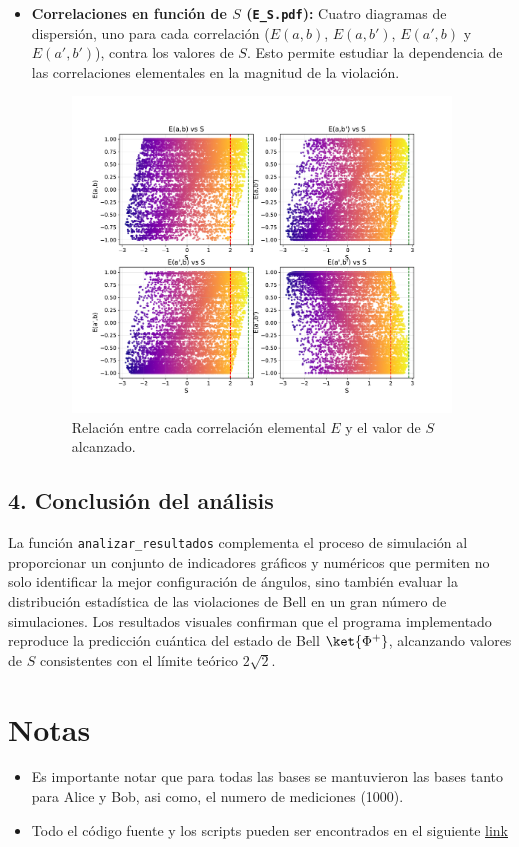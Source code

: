 \documentclass[11pt]{article}
\begin{document}
\begin{itemize}
    \item \textbf{Correlaciones en función de $S$ (\texttt{E\_S.pdf}):}  
    Cuatro diagramas de dispersión, uno para cada correlación ($E(a,b)$, $E(a,b')$, $E(a',b)$ y $E(a',b')$), contra los valores de $S$. Esto permite estudiar la dependencia de las correlaciones elementales en la magnitud de la violación.
    
    \begin{figure}[H]
        \centering
        \includegraphics[width=0.95\textwidth]{Figures/E_S.pdf}
        \caption{Relación entre cada correlación elemental $E$ y el valor de $S$ alcanzado.}
    \end{figure}
\end{itemize}


\subsection*{4. Conclusión del análisis}
La función \texttt{analizar\_resultados} complementa el proceso de simulación al proporcionar un conjunto de indicadores gráficos y numéricos que permiten no solo identificar la mejor configuración de ángulos, sino también evaluar la distribución estadística de las violaciones de Bell en un gran número de simulaciones. Los resultados visuales confirman que el programa implementado reproduce la predicción cuántica del estado de Bell $\ket{\Phi^+}$, alcanzando valores de $S$ consistentes con el límite teórico $2\sqrt{2}$.





\section{Notas}

\begin{itemize}
    \item Es importante notar que para todas las bases se mantuvieron las bases tanto para Alice y Bob, asi como, el numero de mediciones (1000).
    \item Todo el código fuente y los scripts pueden ser encontrados en el siguiente \href{https://github.com/LukasWolff2002/TAREA_5_QM}{link}
\end{itemize}
\end{document}
